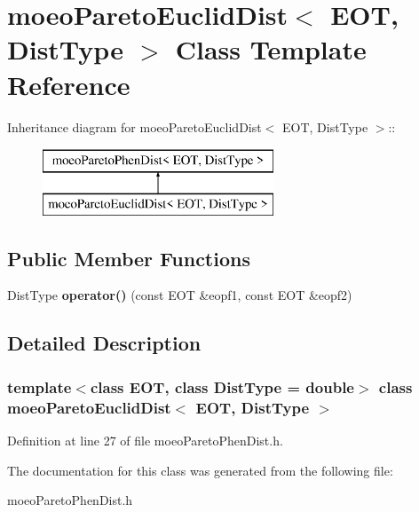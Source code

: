 \section{moeo\-Pareto\-Euclid\-Dist$<$ EOT, Dist\-Type $>$ Class Template Reference}
\label{classmoeoParetoEuclidDist}
Inheritance diagram for moeo\-Pareto\-Euclid\-Dist$<$ EOT, Dist\-Type $>$::\begin{figure}[H]
\begin{center}
\leavevmode
\includegraphics[height=2cm]{classmoeoParetoEuclidDist}
\end{center}
\end{figure}
\subsection*{Public Member Functions}
\begin{CompactItemize}
\item 
Dist\-Type {\bf operator()} (const EOT \&eopf1, const EOT \&eopf2)\label{classmoeoParetoEuclidDist_5369b5167c0305ca99836ed2122d8c8b}

\end{CompactItemize}


\subsection{Detailed Description}
\subsubsection*{template$<$class EOT, class Dist\-Type = double$>$ class moeo\-Pareto\-Euclid\-Dist$<$ EOT, Dist\-Type $>$}





Definition at line 27 of file moeo\-Pareto\-Phen\-Dist.h.

The documentation for this class was generated from the following file:\begin{CompactItemize}
\item 
moeo\-Pareto\-Phen\-Dist.h\end{CompactItemize}
